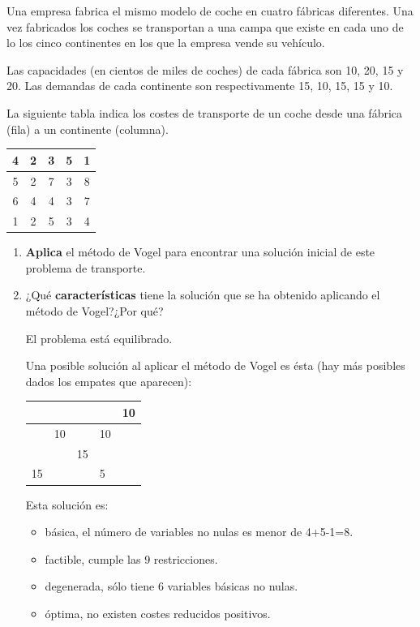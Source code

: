 Una empresa fabrica el mismo modelo de coche en cuatro fábricas diferentes. Una vez fabricados los coches se transportan a una campa que existe en cada uno de lo los cinco continentes en los que la empresa vende su vehículo.

Las capacidades (en cientos de miles de coches) de cada fábrica son 10, 20, 15 y 20. Las demandas de cada continente son respectivamente 15, 10, 15, 15 y 10.

La siguiente tabla indica los costes de transporte de un coche desde una fábrica (fila) a un continente (columna).

\begin{table}[h]
\begin{center}
\begin{tabular}{|c|c|c|c|c|}
\hline
4 & 2 & 3 & 5 & 1 \\ \hline
5 & 2 & 7 & 3 & 8 \\ \hline
6 & 4 & 4 & 3 & 7 \\ \hline
1 & 2 & 5 & 3 & 4 \\ \hline
\end{tabular}
\end{center}
\end{table}

\begin{enumerate}
    \item \textbf{Aplica} el método de Vogel para encontrar una solución inicial de este problema de transporte.
   
    
    \item ¿Qué \textbf{características} tiene la solución que se ha obtenido aplicando el método de Vogel?¿Por qué?

     
    El problema está equilibrado.

    Una posible solución al aplicar el método de Vogel es ésta (hay más posibles dados los empates que aparecen):

\begin{table}[h!]
\begin{center}
\begin{tabular}{|l|l|l|l|l|}
\hline
   &    &    &    & 10 \\ \hline
   & 10 &    & 10 &    \\ \hline
   &    & 15 &    &    \\ \hline
15 &    &    & 5  &    \\ \hline
\end{tabular}
\end{center}
\end{table}
    Esta solución es:
    \begin{itemize}
        \item básica, el número de variables no nulas es menor de 4+5-1=8.
        \item factible, cumple las 9 restricciones.
        \item degenerada, sólo tiene 6 variables básicas no nulas.
        \item óptima, no existen costes reducidos positivos.
    \end{itemize}
\end{enumerate}

